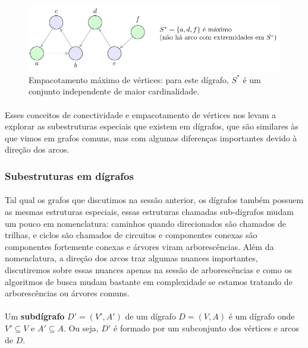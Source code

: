 \documentclass[12pt,a4paper]{article}
\begin{document}
\begin{figure}[H]
    \centering
    \includegraphics[width=0.9\linewidth]{figures/fig_empacotamento_max.pdf}

    \caption{Empacotamento máximo de vértices: para este dígrafo, $S^{*}$ é um conjunto independente de maior cardinalidade.}
    \label{fig:empacotamento-max}
\end{figure}


\paragraph{}
Esses conceitos de conectividade e empacotamento de vértices nos levam a explorar as subestruturas especiais que existem em dígrafos, que são similares às que vimos em grafos comuns, mas com algumas diferenças importantes devido à direção dos arcos.

\subsubsection{Subestruturas em dígrafos}

\paragraph{}
Tal qual os grafos que discutimos na sessão anterior, os dígrafos também possuem as mesmas estruturas especiais, essas estruturas chamadas sub-digrafos mudam um pouco em nomenclatura: caminhos quando direcionados são chamados de trilhas, e ciclos são chamados de circuitos e componentes conexas são componentes fortemente conexas e árvores viram arborescências. Além da nomenclatura, a direção dos arcos traz algumas nuances importantes, discutiremos sobre essas nuances apenas na sessão de arborescências e como os algoritmos de busca mudam bastante em complexidade se estamos tratando de arborescências ou árvores comuns.

\paragraph{}
Um \textbf{subdígrafo} \(D' = (V', A')\) de um dígrafo \(D = (V, A)\) é um dígrafo onde \(V' \subseteq V\) e \(A' \subseteq A\). Ou seja, \(D'\) é formado por um subconjunto dos vértices e arcos de \(D\).
\end{document}
